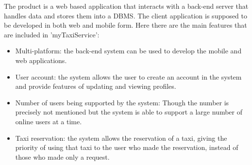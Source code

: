 The product is a web based application that interacts with a back-end server that handles data and stores them into a DBMS.
The client application is supposed to be developed in both web and mobile form.
Here there are the main features that are included in 'myTaxiService':
\begin{itemize}
    \item Multi-platform: the back-end system can be used to develop the mobile and web applications.
    \item User account: the system allows the user to create an account in the system and provide features of updating and viewing profiles.
    \item Number of users being supported by the system: Though the number is precisely not mentioned but the system is able to support a large number of online users at a time.
    \item Taxi reservation: the system allows the reservation of a taxi, giving the priority of using that taxi to the user  who made the reservation, instead of those who made only a request.
\end{itemize}